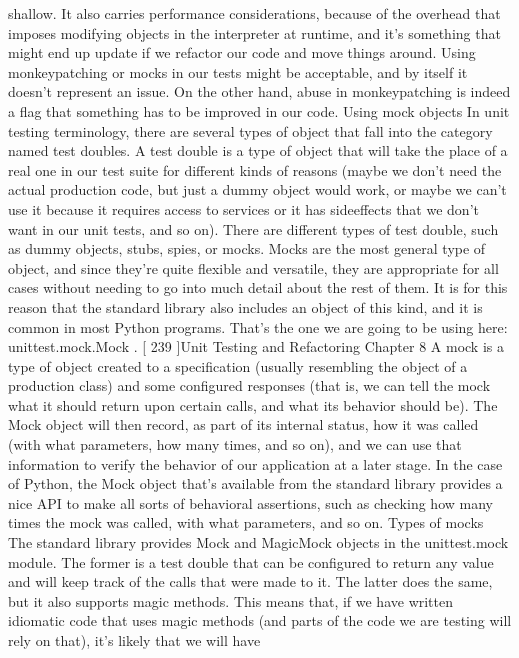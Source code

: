 \documentclass[a4paper,10pt,english]{sphinxmanual}
\begin{document}
shallow. It also carries performance considerations, because of the overhead that imposes
modifying objects in the interpreter at run\sphinxhyphen{}time, and it’s something that might end up
update if we refactor our code and move things around.
Using monkey\sphinxhyphen{}patching or mocks in our tests might be acceptable, and by itself it doesn’t
represent an issue. On the other hand, abuse in monkey\sphinxhyphen{}patching is indeed a flag that
something has to be improved in our code.
Using mock objects
In unit testing terminology, there are several types of object that fall into the category
named test doubles. A test double is a type of object that will take the place of a real one in
our test suite for different kinds of reasons (maybe we don’t need the actual production
code, but just a dummy object would work, or maybe we can’t use it because it requires
access to services or it has side\sphinxhyphen{}effects that we don’t want in our unit tests, and so on).
There are different types of test double, such as dummy objects, stubs, spies, or mocks.
Mocks are the most general type of object, and since they’re quite flexible and versatile, they
are appropriate for all cases without needing to go into much detail about the rest of them.
It is for this reason that the standard library also includes an object of this kind, and it is
common in most Python programs. That’s the one we are going to be using
here: unittest.mock.Mock .
{[} 239 {]}Unit Testing and Refactoring
Chapter 8
A mock is a type of object created to a specification (usually resembling the object of a
production class) and some configured responses (that is, we can tell the mock what it
should return upon certain calls, and what its behavior should be). The Mock object will
then record, as part of its internal status, how it was called (with what parameters, how
many times, and so on), and we can use that information to verify the behavior of our
application at a later stage.
In the case of Python, the Mock object that’s available from the standard library provides a
nice API to make all sorts of behavioral assertions, such as checking how many times the
mock was called, with what parameters, and so on.
Types of mocks
The standard library provides Mock and MagicMock objects in the unittest.mock
module. The former is a test double that can be configured to return any value and will
keep track of the calls that were made to it. The latter does the same, but it also supports
magic methods. This means that, if we have written idiomatic code that uses magic
methods (and parts of the code we are testing will rely on that), it’s likely that we will have
\end{document}

